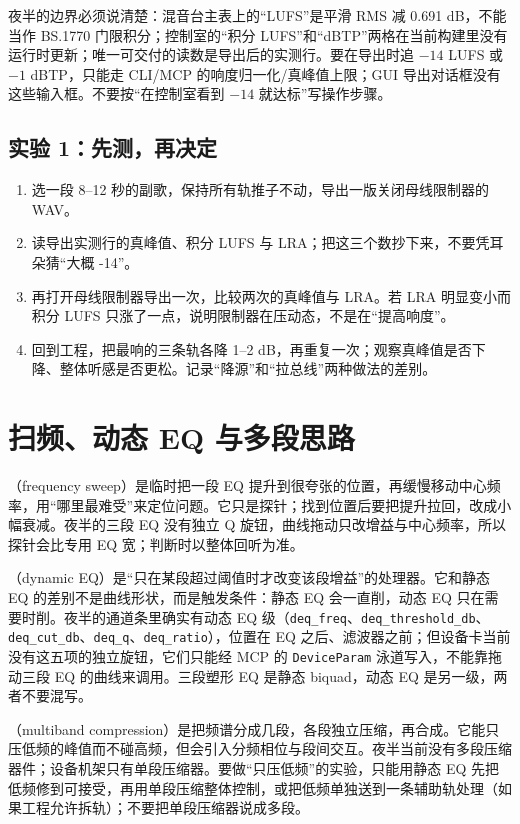 夜半的边界必须说清楚：混音台主表上的“LUFS”是平滑 RMS 减 0.691 dB，不能当作 BS.1770 门限积分；控制室的“积分 LUFS”和“dBTP”两格在当前构建里没有运行时更新；唯一可交付的读数是导出后的实测行。要在导出时追 $-14$ LUFS 或 $-1$ dBTP，只能走 CLI/MCP 的响度归一化/真峰值上限；GUI 导出对话框没有这些输入框。不要按“在控制室看到 $-14$ 就达标”写操作步骤。

\subsection{实验 1：先测，再决定}

\begin{enumerate}
  \item 选一段 8–12 秒的副歌，保持所有轨推子不动，导出一版关闭母线限制器的 WAV。
  \item 读导出实测行的真峰值、积分 LUFS 与 LRA；把这三个数抄下来，不要凭耳朵猜“大概 -14”。
  \item 再打开母线限制器导出一次，比较两次的真峰值与 LRA。若 LRA 明显变小而积分 LUFS 只涨了一点，说明限制器在压动态，不是在“提高响度”。
  \item 回到工程，把最响的三条轨各降 1–2 dB，再重复一次；观察真峰值是否下降、整体听感是否更松。记录“降源”和“拉总线”两种做法的差别。
\end{enumerate}

\section{扫频、动态 EQ 与多段思路}

（frequency sweep）是临时把一段 EQ 提升到很夸张的位置，再缓慢移动中心频率，用“哪里最难受”来定位问题。它只是探针；找到位置后要把提升拉回，改成小幅衰减。夜半的三段 EQ 没有独立 Q 旋钮，曲线拖动只改增益与中心频率，所以探针会比专用 EQ 宽；判断时以整体回听为准。

（dynamic EQ）是“只在某段超过阈值时才改变该段增益”的处理器。它和静态 EQ 的差别不是曲线形状，而是触发条件：静态 EQ 会一直削，动态 EQ 只在需要时削。夜半的通道条里确实有动态 EQ 级（\texttt{deq\_freq}、\texttt{deq\_threshold\_db}、\texttt{deq\_cut\_db}、\texttt{deq\_q}、\texttt{deq\_ratio}），位置在 EQ 之后、滤波器之前；但设备卡当前没有这五项的独立旋钮，它们只能经 MCP 的 \texttt{DeviceParam} 泳道写入，不能靠拖动三段 EQ 的曲线来调用。三段塑形 EQ 是静态 biquad，动态 EQ 是另一级，两者不要混写。

（multiband compression）是把频谱分成几段，各段独立压缩，再合成。它能只压低频的峰值而不碰高频，但会引入分频相位与段间交互。夜半当前没有多段压缩器件；设备机架只有单段压缩器。要做“只压低频”的实验，只能用静态 EQ 先把低频修到可接受，再用单段压缩整体控制，或把低频单独送到一条辅助轨处理（如果工程允许拆轨）；不要把单段压缩器说成多段。

